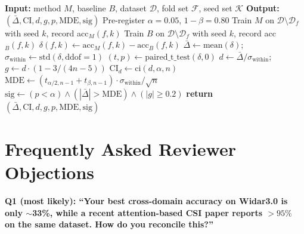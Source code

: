 \documentclass[11pt]{article}
\theoremstyle{definition}
\newcommand{\MDE}{\text{MDE}}
\begin{document}
\begin{algorithm}[!t]
\caption{Paired Multi-Seed Evaluation with MDE Pre-Registration}
\label{alg:paired}
\begin{algorithmic}[1]
\STATE \textbf{Input:} method $M$, baseline $B$, dataset $\mathcal{D}$, fold set $\mathcal{F}$, seed set $\mathcal{K}$
\STATE \textbf{Output:} $(\bar{\Delta}, \text{CI}, d, g, p, \MDE, \text{sig})$
\STATE Pre-register $\alpha = 0.05$, $1 - \beta = 0.80$
        \STATE Train $M$ on $\mathcal{D} \setminus \mathcal{D}_f$ with seed $k$, record acc$_M(f, k)$
        \STATE Train $B$ on $\mathcal{D} \setminus \mathcal{D}_f$ with seed $k$, record acc$_B(f, k)$
        \STATE $\delta(f, k) \gets \text{acc}_M(f, k) - \text{acc}_B(f, k)$
    \ENDFOR
\ENDFOR
\STATE $\bar{\Delta} \gets \mathrm{mean}(\delta)$; $\sigma_{\text{within}} \gets \mathrm{std}(\delta, \mathrm{ddof}=1)$
\STATE $(t, p) \gets \mathrm{paired\_t\_test}(\delta, 0)$
\STATE $d \gets \bar{\Delta} / \sigma_{\text{within}}$; $g \gets d \cdot (1 - 3 / (4n - 5))$
\STATE $\text{CI}_d \gets \mathrm{ci}(d, \alpha, n)$  
\STATE $\MDE{} \gets (t_{\alpha/2, n-1} + t_{\beta, n-1}) \cdot \sigma_{\text{within}} / \sqrt{n}$
\STATE $\text{sig} \gets (p < \alpha) \land (|\bar{\Delta}| > \MDE) \land (|g| \geq 0.2)$
\STATE \textbf{return} $(\bar{\Delta}, \text{CI}, d, g, p, \MDE, \text{sig})$
\end{algorithmic}
\end{algorithm}


\section{Frequently Asked Reviewer Objections}

\noindent\textbf{Q1 (most likely): ``Your best cross-domain accuracy on Widar3.0 is only $\sim$33\%, while a recent attention-based CSI paper reports $>95\%$ on the same dataset. How do you reconcile this?''}
\end{document}
